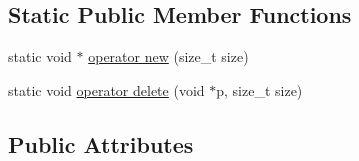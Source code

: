\subsection*{Static Public Member Functions}
\begin{DoxyCompactItemize}
\item 
static void $\ast$ \hyperlink{union_simulator_1_1_c_d_m_a_1_1_node_1_1_message_a8398e0bb4cc431c1625043ef0ca5d5fb}{operator new} (size\+\_\+t size)
\item 
static void \hyperlink{union_simulator_1_1_c_d_m_a_1_1_node_1_1_message_af816a8d8ad8a8db6f4ae14fa451e73e2}{operator delete} (void $\ast$p, size\+\_\+t size)
\end{DoxyCompactItemize}
\subsection*{Public Attributes}
